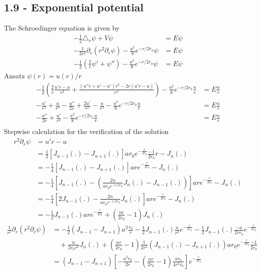\documentclass[../main.tex]{subfiles}
\begin{document}
\subsection{1.9 - Exponential potential}
The Schroedinger equation is given by
\begin{align}
-\frac{1}{2}\triangle_r\psi+V\psi&=E\psi\\
-\frac{1}{2r^2}\partial_r(r^2\partial_r \psi)-\frac{a^2}{8}e^{-r/2r_0}\psi&=E\psi\\
-\frac{1}{2}\left(\frac{2}{r}\psi'+\psi''\right)-\frac{a^2}{8}e^{-r/2r_0}\psi&=E\psi
\end{align}
Ansatz $\psi(r)=u(r)/r$
\begin{align}
-\frac{1}{2}\left(\frac{2}{r}\frac{u'r-u}{r^2}+\frac{(u''r+u'-u')r^2-2r(u'r-u)}{r^4}\right)-\frac{a^2}{8}e^{-r/2r_0}\frac{u}{r}&=E\frac{u}{r}\\
-\frac{u'}{r^2}+\frac{u}{r^3}-\frac{u''}{2r}+\frac{2u'}{r^2}-\frac{u}{r^3}-\frac{a^2}{8}e^{-r/2r_0}\frac{u}{r}&=E\frac{u}{r}\\
-\frac{u''}{2r}+\frac{u'}{r^2}-\frac{a^2}{8}e^{-r/2r_0}\frac{u}{r}&=E\frac{u}{r}\\
\end{align}
Stepwise calculation for the verification of the solution
\begin{align}
r^2\partial_r \psi
&=u'r-u\\
&=\frac{1}{2}\left[J_{n-1}(.)-J_{n+1}(.)\right]ar_0e^{-\frac{r}{2r_0}}\frac{-1}{2r_0}r-J_n(.)\\
&=-\frac{1}{4}\left[J_{n-1}(.)-J_{n+1}(.)\right]are^{-\frac{r}{2r_0}}-J_n(.)\\
&=-\frac{1}{4}\left[J_{n-1}(.)-\left(\frac{2n}{ar_0e^{-r/2r_0}}J_n(.)-J_{n-1}(.)\right)\right]are^{-\frac{r}{2r_0}}-J_n(.)\\
&=-\frac{1}{4}\left[2J_{n-1}(.)-\frac{2n}{ar_0e^{-r/2r_0}}J_n(.)\right]are^{-\frac{r}{2r_0}}-J_n(.)\\
&=-\frac{1}{2}J_{n-1}(.)are^{-\frac{r}{2r_0}}+\left(\frac{nr}{2r_0}-1\right)J_n(.)
\end{align}
\begin{align}
\frac{1}{r^2}\partial_r(r^2\partial_r \psi)
&=-\frac{1}{2}\left(J_{n-1}-J_{n+1}\right)a^2\frac{r_0}{r}-\frac{1}{2}J_{n-1}(.)\frac{a}{r^2}e^{-\frac{r}{2r_0}}-\frac{1}{2}J_{n-1}(.)\frac{-a}{2rr_0}e^{-\frac{r}{2r_0}}\\
&\quad+\frac{n}{2r_0r^2}J_n(.)+\left(\frac{nr}{2r_0}-1\right)\frac{1}{2r^2}(J_{n-1}(.)-J_{n+1}(.))ar_0e^{-\frac{r}{2r_0}}\frac{-1}{2r_0}\\
&=\left(J_{n-1}-J_{n+1}\right)\left[-\frac{a^2r_0}{2r}-\left(\frac{nr}{2r_0}-1\right)\frac{ar_0}{4r^2r_0}\right]e^{-\frac{r}{2r_0}}
\end{align}
\end{document}
